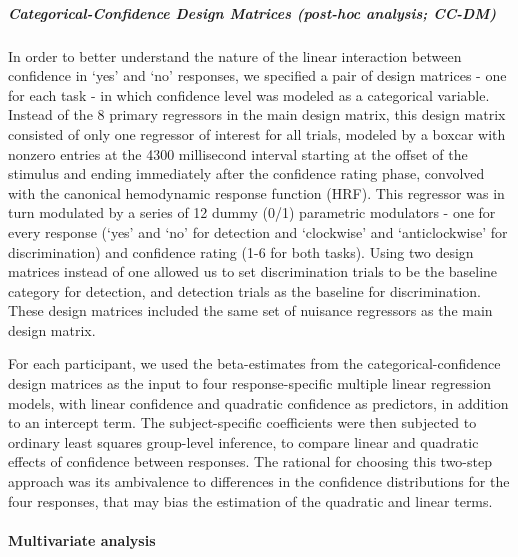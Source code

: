 \documentclass[12pt,twoside]{reedthesis}
\begin{document}
\hypertarget{categoricalDM}{%
\subparagraph*{Categorical-Confidence Design Matrices (post-hoc analysis; CC-DM)}\label{categoricalDM}}

In order to better understand the nature of the linear interaction between confidence in `yes' and `no' responses, we specified a pair of design matrices - one for each task - in which confidence level was modeled as a categorical variable. Instead of the 8 primary regressors in the main design matrix, this design matrix consisted of only one regressor of interest for all trials, modeled by a boxcar with nonzero entries at the 4300 millisecond interval starting at the offset of the stimulus and ending immediately after the confidence rating phase, convolved with the canonical hemodynamic response function (HRF). This regressor was in turn modulated by a series of 12 dummy (0/1) parametric modulators - one for every response (`yes' and `no' for detection and `clockwise' and `anticlockwise' for discrimination) and confidence rating (1-6 for both tasks). Using two design matrices instead of one allowed us to set discrimination trials to be the baseline category for detection, and detection trials as the baseline for discrimination. These design matrices included the same set of nuisance regressors as the main design matrix.

For each participant, we used the beta-estimates from the categorical-confidence design matrices as the input to four response-specific multiple linear regression models, with linear confidence and quadratic confidence as predictors, in addition to an intercept term. The subject-specific coefficients were then subjected to ordinary least squares group-level inference, to compare linear and quadratic effects of confidence between responses. The rational for choosing this two-step approach was its ambivalence to differences in the confidence distributions for the four responses, that may bias the estimation of the quadratic and linear terms.

\hypertarget{multivariate-analysis}{%
\paragraph*{Multivariate analysis}\label{multivariate-analysis}}
\end{document}
